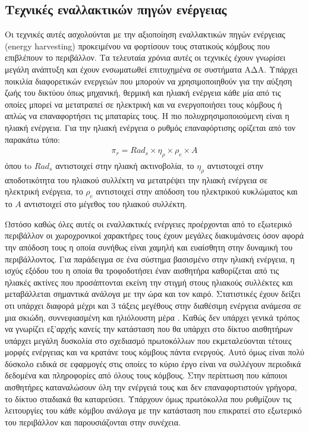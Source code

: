 \subsection{Τεχνικές εναλλακτικών πηγών ενέργειας}
Οι τεχνικές αυτές ασχολούνται με την αξιοποίηση εναλλακτικών πηγών ενέργειας (energy harvesting) προκειμένου να φορτίσουν τους στατικούς κόμβους που επιβλέπουν το
περιβάλλον. Τα τελευταία χρόνια αυτές οι τεχνικές έχουν γνωρίσει μεγάλη ανάπτυξη και έχουν ενσωματωθεί επιτυχημένα σε συστήματα ΑΔΑ. Υπάρχει ποικιλία διαφορετικών
ενεργειών που μπορούν να χρησιμοποιηθούν για την αύξηση ζωής του δικτύου όπως μηχανική, θερμική και ηλιακή ενέργεια κάθε μία από τις οποίες μπορεί να μετατραπεί σε
ηλεκτρική και να
ενεργοποιήσει τους κόμβους ή απλώς να επαναφορτήσει τις μπαταρίες τους. Η πιο πολυχρησιμοποιούμενη είναι η ηλιακή ενέργεια. Για την ηλιακή ενέργεια ο ρυθμός
επαναφόρτισης ορίζεται από τον παρακάτω τύπο:
\begin{align*}
\pi_{r} = Rad_{s} \times \eta_{\rho} \times \rho_{e} \times A
\end{align*}
όπου to $Rad_{s}$ αντιστοιχεί στην ηλιακή ακτινοβολία, το $\eta_{\rho}$ αντιστοιχεί στην αποδοτικότητα του ηλιακού συλλέκτη να μετατρέψει την ηλιακή ενέργεια σε
ηλεκτρική ενέργεια, το $\rho_{e}$ αντιστοιχεί στην απόδοση του ηλεκτρικού κυκλώματος και το $A$ αντιστοιχεί στο μέγεθος του ηλιακού συλλέκτη.

Ωστόσο καθώς όλες αυτές οι εναλλακτικές ενέργειες προέρχονται από το εξωτερικό περιβάλλον οι χωροχρονικοί χαρακτήρες τους έχουν μεγάλες διακυμάνσεις όσον αφορά την
απόδοση τους η οποία συνήθως είναι χαμηλή και ευαίσθητη στην δυναμική του περιβάλλοντος. Για παράδειγμα σε ένα σύστημα βασισμένο στην ηλιακή ενέργεια, η ισχύς εξόδου
του η οποία θα τροφοδοτήσει έναν αισθητήρα καθορίζεται από τις ηλιακές ακτίνες που προσάπτονται εκείνη την στιγμή στους ηλιακούς συλλέκτες και μεταβάλλεται σημαντικά
ανάλογα με την ώρα και τον καιρό. Στατιστικές έχουν δείξει οτι υπάρχει διαφορά μέχρι και 3 τάξεις μεγέθους στην διαθέσιμη ενέργεια ανάμεσα σε μια σκιώδη,
συννεφιασμένη και ηλιόλουστη μέρα \cite{harvesting_comparison}. Καθώς δεν υπάρχει γενικά τρόπος να γνωρίζει εξ'αρχής κανείς την κατάσταση που θα υπάρχει στο δίκτυο
αισθητήρων υπάρχει μεγάλη δυσκολία στο σχεδιασμό πρωτοκόλλων που εκμεταλεύονται τέτοιες μορφές ενέργειας και να κρατάνε τους κόμβους πάντα ενεργούς. Αυτό όμως είναι
πολύ δύσκολο ειδικά σε εφαρμογές στις οποίες το κύριο έργο είναι να συλλέγουν περιοδικά δεδομένα και πληροφορίες από όλους τους κόμβους. Στην περίπτωση που κάποιοι
αισθητήρες καταναλώσουν όλη την ενέργειά τους και δεν επαναφορτιστούν γρήγορα, το δίκτυο σταδιακά θα καταρεύσει. Υπάρχουν όμως πρωτόκολλα που ρυθμίζουν τις
λειτουργίες του κάθε κόμβου ανάλογα με την κατάσταση που επικρατεί στο εξωτερικό του περιβάλλον και παρουσιάζονται στην συνέχεια.

